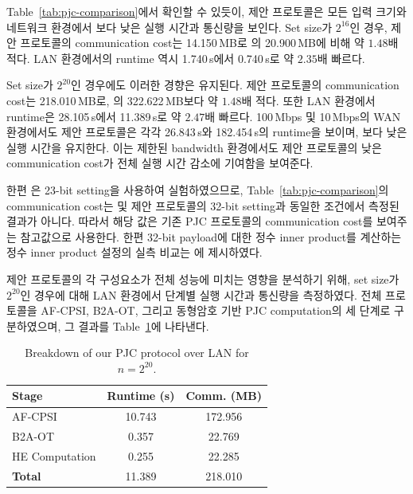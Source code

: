 \documentclass[sigconf,anonymous,review]{acmart}
\begin{document}
Table~\ref{tab:pjc-comparison}에서 확인할 수 있듯이,
제안 프로토콜은 모든 입력 크기와 네트워크 환경에서
\cite{KLS26}보다 낮은 실행 시간과 통신량을 보인다.
Set size가 $2^{16}$인 경우, 제안 프로토콜의 communication cost는
14.150\,MB로 \cite{KLS26}의 20.900\,MB에 비해 약 $1.48$배 적다.
LAN 환경에서의 runtime 역시 1.740\,s에서 0.740\,s로
약 $2.35$배 빠르다.

Set size가 $2^{20}$인 경우에도 이러한 경향은 유지된다.
제안 프로토콜의 communication cost는 218.010\,MB로,
\cite{KLS26}의 322.622\,MB보다 약 $1.48$배 적다.
또한 LAN 환경에서 runtime은 28.105\,s에서 11.389\,s로
약 $2.47$배 빠르다.
100\,Mbps 및 10\,Mbps의 WAN 환경에서도 제안 프로토콜은
각각 26.843\,s와 182.454\,s의 runtime을 보이며,
\cite{KLS26}보다 낮은 실행 시간을 유지한다.
이는 제한된 bandwidth 환경에서도 제안 프로토콜의 낮은
communication cost가 전체 실행 시간 감소에 기여함을 보여준다.

한편 \cite{CHI+23}은 23-bit setting을 사용하여 실험하였으므로,
Table~\ref{tab:pjc-comparison}의 communication cost는
\cite{KLS26} 및 제안 프로토콜의 32-bit setting과 동일한 조건에서
측정된 결과가 아니다. 따라서 해당 값은 기존 PJC 프로토콜의
communication cost를 보여주는 참고값으로 사용한다.
한편 32-bit payload에 대한 정수 inner product를 계산하는
정수 inner product 설정의 실측 비교는 에 제시하였다.



제안 프로토콜의 각 구성요소가 전체 성능에 미치는 영향을 분석하기 위해,
set size가 $2^{20}$인 경우에 대해 LAN 환경에서 단계별 실행 시간과
통신량을 측정하였다.
전체 프로토콜을 AF-CPSI, B2A-OT, 그리고 동형암호 기반
PJC computation의 세 단계로 구분하였으며,
그 결과를 Table~\ref{tab:pjc-breakdown}에 나타낸다.

\begin{table}[h]
\centering
\caption{Breakdown of our PJC protocol over LAN for $n=2^{20}$.}
\label{tab:pjc-breakdown}
\begin{tabular}{lcc}
\toprule
\textbf{Stage}
&
\textbf{Runtime (s)}
&
\textbf{Comm. (MB)}
\\
\midrule
AF-CPSI&10.743&172.956\\
B2A-OT&0.357&22.769\\
HE Computation&0.255&22.285\\
\midrule
\textbf{Total}&11.389&218.010\\
\bottomrule
\end{tabular}
\end{table}
\end{document}
